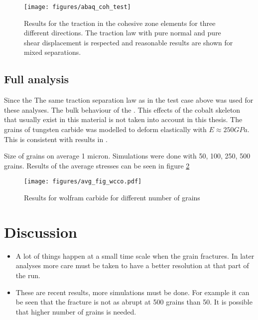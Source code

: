 \documentclass[wcco.tex]{subfiles}
\begin{document}
\begin{figure}[ht]
\centering
\texttt{[image: figures/abaq\_coh\_test]}
\caption{Results for the traction in the cohesive zone elements for three different directions. The traction law with pure normal and pure shear displacement is respected and reasonable results are shown for mixed separations. }
\label{fig:test_cases}
\end{figure}


\subsection{Full analysis}

Since the The same traction separation law as in the test case above was used for these analyses. The bulk behaviour of the .
This effects of the cobalt skeleton that usually exist in this material is not taken into account in this thesis. The grains of tungsten carbide was modelled to deform elastically with $E \approx 250GPa$. This is consistent with results in \cite{Buss04}.

Size of grains on average 1 micron. Simulations were done with 50, 100, 250, 500 grains. Results of the average stresses can be seen in figure \ref{fig:wcco_res}

\begin{figure}[ht]
\centering
\texttt{[image: figures/avg\_fig\_wcco.pdf]}
\caption{Results for wolfram carbide for different number of grains}
\label{fig:wcco_res}
\end{figure}


\section{Discussion}
\begin{itemize}
\item A lot of things happen at a small time scale when the grain fractures. In later analyses more care must be taken to have a better resolution at that part of the run.
\item These are recent results, more simulations must be done. For example it can be seen that the fracture is not as abrupt at 500 grains than 50. It is possible that higher number of grains is needed.
\end{itemize}
\end{document}
